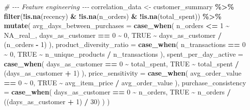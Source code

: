 \documentclass[
]{article}
\newenvironment{Shaded}{\begin{snugshade}}{\end{snugshade}}
\newcommand{\AttributeTok}[1]{\textcolor[rgb]{0.13,0.29,0.53}{#1}}
\newcommand{\CommentTok}[1]{\textcolor[rgb]{0.56,0.35,0.01}{\textit{#1}}}
\newcommand{\ConstantTok}[1]{\textcolor[rgb]{0.56,0.35,0.01}{#1}}
\newcommand{\DecValTok}[1]{\textcolor[rgb]{0.00,0.00,0.81}{#1}}
\newcommand{\FunctionTok}[1]{\textcolor[rgb]{0.13,0.29,0.53}{\textbf{#1}}}
\newcommand{\NormalTok}[1]{#1}
\newcommand{\OtherTok}[1]{\textcolor[rgb]{0.56,0.35,0.01}{#1}}
\newcommand{\SpecialCharTok}[1]{\textcolor[rgb]{0.81,0.36,0.00}{\textbf{#1}}}
\begin{document}
\begin{Shaded}
\begin{Highlighting}[]
  \CommentTok{\# {-}{-}{-} Feature engineering {-}{-}{-}}
\NormalTok{  correlation\_data }\OtherTok{\textless{}{-}}\NormalTok{ customer\_summary }\SpecialCharTok{\%\textgreater{}\%}
    \FunctionTok{filter}\NormalTok{(}\SpecialCharTok{!}\FunctionTok{is.na}\NormalTok{(recency) }\SpecialCharTok{\&} \SpecialCharTok{!}\FunctionTok{is.na}\NormalTok{(n\_orders) }\SpecialCharTok{\&} \SpecialCharTok{!}\FunctionTok{is.na}\NormalTok{(total\_spent)) }\SpecialCharTok{\%\textgreater{}\%}
    \FunctionTok{mutate}\NormalTok{(}
      \AttributeTok{avg\_days\_between\_purchases =} \FunctionTok{case\_when}\NormalTok{(}
\NormalTok{        n\_orders }\SpecialCharTok{\textless{}=} \DecValTok{1} \SpecialCharTok{\textasciitilde{}} \ConstantTok{NA\_real\_}\NormalTok{,}
\NormalTok{        days\_as\_customer }\SpecialCharTok{==} \DecValTok{0} \SpecialCharTok{\textasciitilde{}} \DecValTok{0}\NormalTok{,}
        \ConstantTok{TRUE} \SpecialCharTok{\textasciitilde{}}\NormalTok{ days\_as\_customer }\SpecialCharTok{/}\NormalTok{ (n\_orders }\SpecialCharTok{{-}} \DecValTok{1}\NormalTok{)}
\NormalTok{      ),}
      \AttributeTok{product\_diversity\_ratio =} \FunctionTok{case\_when}\NormalTok{(}
\NormalTok{        n\_transactions }\SpecialCharTok{==} \DecValTok{0} \SpecialCharTok{\textasciitilde{}} \DecValTok{0}\NormalTok{,}
        \ConstantTok{TRUE} \SpecialCharTok{\textasciitilde{}}\NormalTok{ n\_unique\_products }\SpecialCharTok{/}\NormalTok{ n\_transactions}
\NormalTok{      ),}
      \AttributeTok{spent\_per\_day\_active =} \FunctionTok{case\_when}\NormalTok{(}
\NormalTok{        days\_as\_customer }\SpecialCharTok{==} \DecValTok{0} \SpecialCharTok{\textasciitilde{}}\NormalTok{ total\_spent,}
        \ConstantTok{TRUE} \SpecialCharTok{\textasciitilde{}}\NormalTok{ total\_spent }\SpecialCharTok{/}\NormalTok{ (days\_as\_customer }\SpecialCharTok{+} \DecValTok{1}\NormalTok{)}
\NormalTok{      ),}
      \AttributeTok{price\_sensitivity =} \FunctionTok{case\_when}\NormalTok{(}
\NormalTok{        avg\_order\_value }\SpecialCharTok{==} \DecValTok{0} \SpecialCharTok{\textasciitilde{}} \DecValTok{0}\NormalTok{,}
        \ConstantTok{TRUE} \SpecialCharTok{\textasciitilde{}}\NormalTok{ avg\_item\_price }\SpecialCharTok{/}\NormalTok{ avg\_order\_value}
\NormalTok{      ),}
      \AttributeTok{purchase\_consistency =} \FunctionTok{case\_when}\NormalTok{(}
\NormalTok{        days\_as\_customer }\SpecialCharTok{==} \DecValTok{0} \SpecialCharTok{\textasciitilde{}}\NormalTok{ n\_orders,}
        \ConstantTok{TRUE} \SpecialCharTok{\textasciitilde{}}\NormalTok{ n\_orders }\SpecialCharTok{/}\NormalTok{ ((days\_as\_customer }\SpecialCharTok{+} \DecValTok{1}\NormalTok{) }\SpecialCharTok{/} \DecValTok{30}\NormalTok{)}
\NormalTok{      )}
\NormalTok{    )}


\end{Highlighting}
\end{Shaded}
\end{document}
